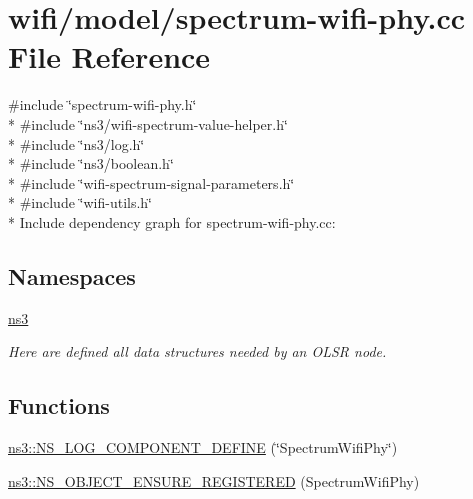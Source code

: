 \hypertarget{spectrum-wifi-phy_8cc}{}\section{wifi/model/spectrum-\/wifi-\/phy.cc File Reference}
\label{spectrum-wifi-phy_8cc}
{\ttfamily \#include \char`\"{}spectrum-\/wifi-\/phy.\+h\char`\"{}}\\*
{\ttfamily \#include \char`\"{}ns3/wifi-\/spectrum-\/value-\/helper.\+h\char`\"{}}\\*
{\ttfamily \#include \char`\"{}ns3/log.\+h\char`\"{}}\\*
{\ttfamily \#include \char`\"{}ns3/boolean.\+h\char`\"{}}\\*
{\ttfamily \#include \char`\"{}wifi-\/spectrum-\/signal-\/parameters.\+h\char`\"{}}\\*
{\ttfamily \#include \char`\"{}wifi-\/utils.\+h\char`\"{}}\\*
Include dependency graph for spectrum-\/wifi-\/phy.cc\+:
\subsection*{Namespaces}
\begin{DoxyCompactItemize}
\item 
 \hyperlink{namespacens3}{ns3}
\begin{DoxyCompactList}\small\item\em Here are defined all data structures needed by an O\+L\+SR node. \end{DoxyCompactList}\end{DoxyCompactItemize}
\subsection*{Functions}
\begin{DoxyCompactItemize}
\item 
\hyperlink{namespacens3_a50b56fc725aae3292a95b2d9006dbf19}{ns3\+::\+N\+S\+\_\+\+L\+O\+G\+\_\+\+C\+O\+M\+P\+O\+N\+E\+N\+T\+\_\+\+D\+E\+F\+I\+NE} (\char`\"{}Spectrum\+Wifi\+Phy\char`\"{})
\item 
\hyperlink{namespacens3_ae5b7ba6dd779df4e2fbc7ff3a143e2a1}{ns3\+::\+N\+S\+\_\+\+O\+B\+J\+E\+C\+T\+\_\+\+E\+N\+S\+U\+R\+E\+\_\+\+R\+E\+G\+I\+S\+T\+E\+R\+ED} (Spectrum\+Wifi\+Phy)
\end{DoxyCompactItemize}
